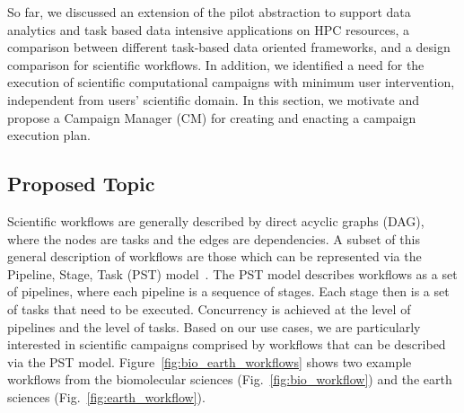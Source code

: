 \label{research}
So far, we discussed an extension of the pilot abstraction to support data analytics and task based data intensive applications on HPC resources, a comparison between different task-based data oriented frameworks, and a design comparison for scientific workflows.
In addition, we identified a need for the execution of scientific computational campaigns with minimum user intervention, independent from users' scientific domain.
In this section, we motivate and propose a Campaign Manager (CM) for creating and enacting a campaign execution plan. 


\subsection{Proposed Topic}

Scientific workflows are generally described by direct acyclic graphs (DAG), where the nodes are tasks and the edges are dependencies.
A subset of this general description of workflows are those which can be represented via the Pipeline, Stage, Task (PST) model~\cite{balasubramanian2018harnessing}.
The PST model describes workflows as a set of pipelines, where each pipeline is a sequence of stages.
Each stage then is a set of tasks that need to be executed.
Concurrency is achieved at the level of pipelines and the level of tasks. 
Based on our use cases, we are particularly interested in scientific campaigns comprised by workflows that can be described via the PST model. 
Figure~\ref{fig:bio_earth_workflows} shows two example workflows from the biomolecular sciences (Fig.~\ref{fig:bio_workflow}) and the earth sciences (Fig.~\ref{fig:earth_workflow}). 

